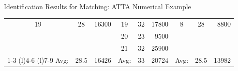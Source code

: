 \documentclass[hyperref={pdfpagelabels=false}]{beamer}
\begin{document}
\begin{frame}{Identification Results for Matching: ATT}{A Numerical Example}
\begin{center}
{\begin{threeparttable}
\begin{tabular}{@{} ccrccrccr @{}}
					{\color{red}19} & {\color{red}28} & {\color{red}16300} & 19 & 32 & 17800 &  {\color{red}8} & {\color{red}28} & {\color{red}8800}  \\ 
					&    &       & 20 & 23 & 9500  &    &  &   \\
					&    &       & 21 & 32 & 25900 &    &  &   \\ 
					\cmidrule(l){1-3}  \cmidrule(l){4-6} \cmidrule(l){7-9} 
					Avg: & 28.5 & 16426 & Avg: & 33 & 20724 & Avg: & 28.5 & 13982 \\
				\end{tabular}
		\end{threeparttable}}
	\end{center}
\end{frame}
\end{document}

